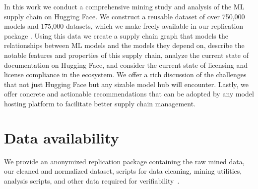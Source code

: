 In this work we conduct a comprehensive mining study and analysis of the ML supply chain on Hugging Face. We construct a reusable dataset of over 750,000 models and 175,000 datasets, which we make freely available in our replication package \cite{anonymous_repo}.  Using this data we create a supply chain graph that models the relationships between ML models and the models they depend on, describe the notable features and properties of this supply chain, analyze the current state of documentation on Hugging Face, and consider the current state of licensing and license compliance in the ecosystem.  We offer a rich discussion of the challenges that not just Hugging Face but any sizable model hub will encounter.  Lastly, we offer concrete and actionable recommendations that can be adopted by any model hosting platform to facilitate better supply chain management.

\section*{Data availability}
We provide an anonymized replication package containing the raw mined data, our cleaned and normalized dataset, scripts for data cleaning, mining utilities, analysis scripts, and other data required for verifiability~\cite{anonymous_repo}. %

